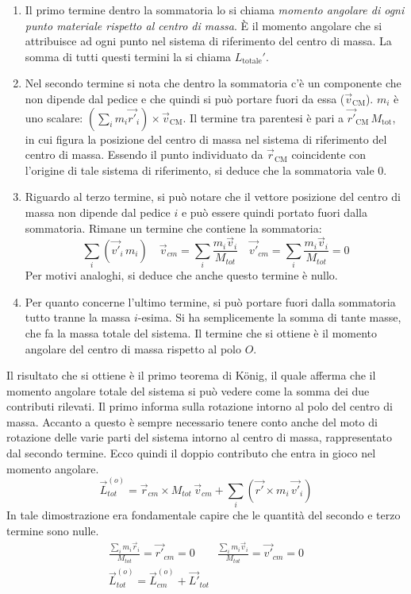 \documentclass[10pt,a4paper]{book}
\begin{document}
\begin{enumerate}
	\item Il primo termine dentro la sommatoria lo si chiama \emph{momento angolare di ogni punto materiale rispetto al centro di massa}. È il momento angolare che si attribuisce ad ogni punto nel sistema di riferimento del centro di massa. La somma di tutti questi termini la si chiama $L_{\text{totale}}'$.
	\item Nel secondo termine si nota che dentro la sommatoria c'è un componente che non dipende dal pedice e che quindi si può portare fuori da essa ($\vec{v}_\text{CM}$). $m_i$ è uno scalare: $(\sum_i m_i\vec{r'}_i)\times \vec{v}_\text{CM}$. Il termine tra parentesi è pari a $\vec{r'}_\text{CM} \, M_\text{tot}$, in cui figura la posizione del centro di massa nel sistema di riferimento del centro di massa. Essendo il punto individuato da $\vec{r}_\text{CM}$ coincidente con l'origine di tale sistema di riferimento, si deduce che la sommatoria vale $0$.
	\item Riguardo al terzo termine, si può notare che il vettore posizione del centro di massa non dipende dal pedice $i$ e può essere quindi portato fuori dalla sommatoria. Rimane un termine che contiene la sommatoria:
	\[
		\sum_i (\vec{v'}_i\,m_i ) \quad \vec{v}_{cm} = \sum_i \frac{m_i\vec{v}_i  }{M_{tot} } \quad \vec{v'}_{cm} = \sum_i \frac{m_i\vec{v}_i}{M_{tot} } = 0
	\]
	Per motivi analoghi, si deduce che anche questo termine è nullo.
	\item Per quanto concerne l'ultimo termine, si può portare fuori dalla sommatoria tutto tranne la massa $i$-esima. Si ha semplicemente la somma di tante masse, che fa la massa totale del sistema. Il termine che si ottiene è il momento angolare del centro di massa rispetto al polo $O$.
\end{enumerate}
Il risultato che si ottiene è il primo teorema di K\"onig, il quale afferma che il momento angolare totale del sistema si può vedere come la somma dei due contributi rilevati.
Il primo informa sulla rotazione intorno al polo del centro di massa. Accanto a questo è sempre necessario tenere conto anche del moto di rotazione delle varie parti del sistema intorno al centro di massa, rappresentato dal secondo termine. Ecco quindi il doppio contributo che entra in gioco nel momento angolare.
\[
	\vec{L}_{tot}^{(o)} = \vec{r}_{cm}\times M_{tot}\,\vec{v}_{cm} + \sum_i (\vec{r'}\times m_i\,\vec{v'}_i)
\]
In tale dimostrazione era fondamentale capire che le quantità del secondo e terzo termine sono nulle.
\begin{gather*}
	\frac{\sum_i m_i\vec{r}_i   }{M_{tot} } = \vec{r'}_{cm} = 0 \qquad \frac{\sum_i m_i\vec{v}_i }{M_{tot} } = \vec{v'}_{cm} = 0 \\
	\boxed{\vec{L}_{tot}^{(o)}   = \vec{L}_{cm}^{(o)} + \vec{L'}_{tot}}
\end{gather*}
\end{document}
